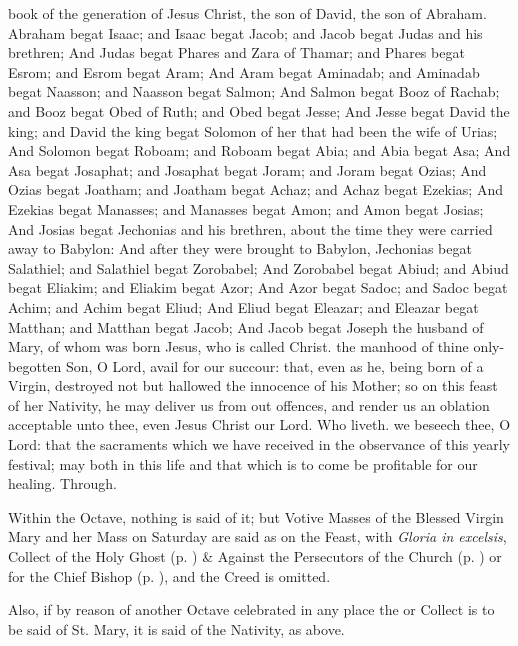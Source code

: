  book of the generation of Jesus Christ, the son of David, the son of Abraham. Abraham begat Isaac; and Isaac begat Jacob; and Jacob begat Judas and his brethren; And Judas begat Phares and Zara of Thamar; and Phares begat Esrom; and Esrom begat Aram; And Aram begat Aminadab; and Aminadab begat Naasson; and Naasson begat Salmon; And Salmon begat Booz of Rachab; and Booz begat Obed of Ruth; and Obed begat Jesse; And Jesse begat David the king; and David the king begat Solomon of her that had been the wife of Urias; And Solomon begat Roboam; and Roboam begat Abia; and Abia begat Asa; And Asa begat Josaphat; and Josaphat begat Joram; and Joram begat Ozias; And Ozias begat Joatham; and Joatham begat Achaz; and Achaz begat Ezekias; And Ezekias begat Manasses; and Manasses begat Amon; and Amon begat Josias; And Josias begat Jechonias and his brethren, about the time they were carried away to Babylon: And after they were brought to Babylon, Jechonias begat Salathiel; and Salathiel begat Zorobabel; And Zorobabel begat Abiud; and Abiud begat Eliakim; and Eliakim begat Azor; And Azor begat Sadoc; and Sadoc begat Achim; and Achim begat Eliud; And Eliud begat Eleazar; and Eleazar begat Matthan; and Matthan begat Jacob; And Jacob begat Joseph the husband of Mary, of whom was born Jesus, who is called Christ.
\secret
{} the manhood of thine only-begotten Son, O Lord, avail for our succour: that, even as he, being born of a Virgin, destroyed not but hallowed the innocence of his Mother; so on this feast of her Nativity, he may deliver us from out offences, and render us an oblation acceptable unto thee, even Jesus Christ our Lord. Who liveth.
\postcommunion
{} we beseech thee, O Lord: that the sacraments which we have received in the observance of this yearly festival; may both in this life and that which is to come be profitable for our healing. Through.

\begin{rubric}
    Within the Octave, nothing is said of it; but Votive Masses of the Blessed Virgin Mary and her Mass on Saturday are said as on the Feast, with \emph{Gloria in excelsis},  Collect of the Holy Ghost (p. \pageref{SPHolyGhost}) \&  Against the Persecutors of the Church (p. \pageref{SPAgainst}) or for the Chief Bishop (p. \pageref{SPChiefBishop}), and the Creed is omitted.
\end{rubric}
\begin{rubric}
    Also, if by reason of another Octave celebrated in any place the  or  Collect is to be said of St. Mary, it is said of the Nativity, as above.
\end{rubric}

